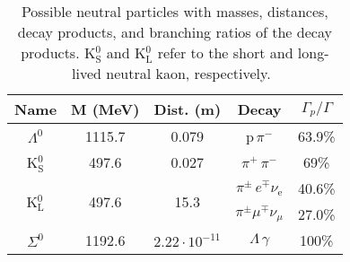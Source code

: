 \documentclass[twocolumn]{article}
\begin{document}
\begin{table} [!h]
	\centering
	\begin{tabular}{|c|c|c|c|c|}
		\hline
		Name & M (MeV) & Dist. (m) & Decay & $\Gamma_p/\Gamma$ \\
		\hline
		$\Lambda^0$ 	& 1115.7 & 0.079 &p$\, \pi^-$ & 63.9\%\\
		\hline
		K$^0_{\text{S}}$	 & 497.6 & 0.027 & $\pi^+ \, \pi^-$ & 69\%\\
		\hline
		\multirow{2}{*}{K$^0_{\text{L}}$} &  \multirow{2}{*}{ 497.6}& \multirow{2}{*}{15.3}&$\pi^{\pm} \, e^{\mp} \nu_{\text{e}}$ & 40.6\%\\
		& & &$\pi^{\pm} \mu ^{\mp} \nu_{\mu}$&27.0\%\\
		\hline
		$\Sigma^0$ & 1192.6 & $2.22 \cdot 10^{-11}$& $\Lambda \, \gamma$ & 100\%\\
		\hline
	\end{tabular}
	\caption{Possible neutral particles with masses, distances, decay products, and branching ratios of the decay products. K$^0_{\text{S}}$ and K$^0_{\text{L}}$ refer to the short and long-lived neutral kaon, respectively.~\cite{pdg}}
	\label{tab:neutral}
\end{table}
\end{document}

